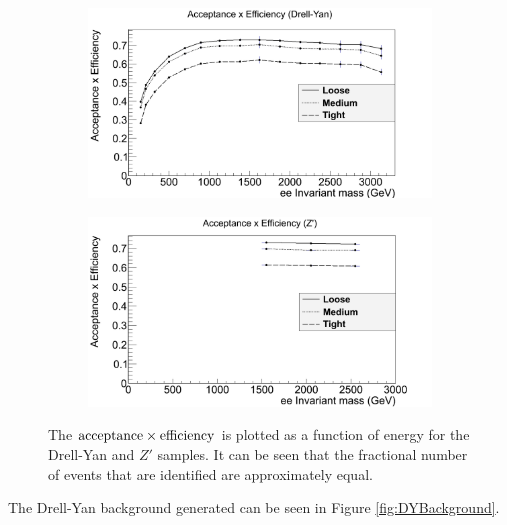 \documentclass{article}
\begin{document}
\begin{figure}[htb]
	\centering
    \begin{subfigure}{.49\textwidth}
    	\raggedleft
        \includegraphics[width=1.13\textwidth]{images/acceptanceDY.png}
        \caption{}
        \label{fig:acceptanceDY}
    \end{subfigure}
    \begin{subfigure}{.49\textwidth}
    	\raggedright
        \includegraphics[width=1.13\textwidth]{images/acceptanceZ.png}
        \caption{}
        \label{fig:acceptanceZ}
    \end{subfigure}    	
    \caption{ The $\rm{acceptance}\times\rm{efficiency}$ is plotted as a function of energy for the Drell-Yan and $Z'$ samples. It can be seen that the fractional number of events that are identified are approximately equal. \label{fig:acceptance}}
\end{figure}

The Drell-Yan background generated can be seen in Figure \ref{fig:DYBackground}.  
\end{document}

